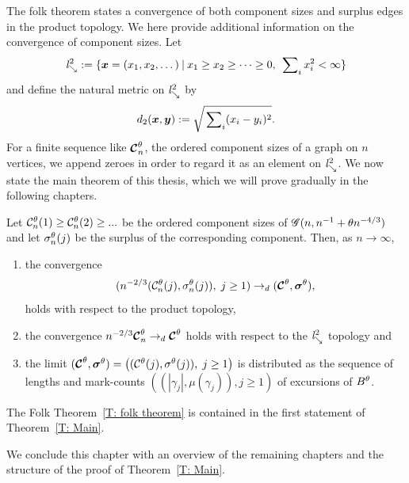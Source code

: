 The folk theorem states a convergence of both component sizes and surplus edges in the product topology.
We here provide additional information on the convergence of component sizes.
Let
\begin{equation} \label{D: ld}
	\mathit{l}^2_{\searrow} := \{ \boldsymbol{x} = (x_1, x_2, \dots) \: | \: x_1 \geq x_2 \geq \dots \geq 0, \; \sideset{}{_i}\sum x^2_i < \infty \}
\end{equation}
and define the natural metric on $\mathit{l}^2_{\searrow}$ by
\begin{equation}
	d_2(\boldsymbol{x},\boldsymbol{y}) := \sqrt{\sideset{}{_i}\sum (x_i - y_i)^2}.
\end{equation}
For a finite sequence like $\boldsymbol{\mathcal{C}}^{\theta}_n$, the ordered component sizes of a graph on $n$ vertices, we append zeroes in order to regard it as an element on $\mathit{l}^2_{\searrow}$.
We now state the main theorem of this thesis, which we will prove gradually in the following chapters.

\begin{theorem} \label{T: Main}
	Let $\mathcal{C}^{\theta}_n(1) \geq \mathcal{C}^{\theta}_n(2) \geq ... $ be the ordered component sizes of $\mathscr{G}(n, n^{-1} + \theta n^{-4/3})$
	and let $\mathcal{\sigma}^{\theta}_n(j)$ be the surplus of the corresponding component.
	Then, as $n \rightarrow \infty$,
	\begin{enumerate}
		\item the convergence
		\begin{equation}
		( n^{-2 / 3} ( \mathcal{C}^{\theta}_n(j), \mathcal{\sigma}^{\theta}_n(j) ), \; j \geq 1 ) 
		\rightarrow_d
		( \boldsymbol{\mathcal{C}}^{\theta}, \boldsymbol{\mathcal{\sigma}}^{\theta} ),
		\end{equation}
		holds with respect to the product topology,
		
		\item the convergence $n^{-2 / 3} \boldsymbol{\mathcal{C}}^{\theta}_n \rightarrow_d \boldsymbol{\mathcal{C}}^{\theta}$
		holds with respect to the $\mathit{l}^2_{\searrow}$ topology and
		
		\item the limit
		$( \boldsymbol{\mathcal{C}}^{\theta}, \boldsymbol{\mathcal{\sigma}}^{\theta} ) = \left( ( \mathcal{C}^{\theta}(j), \mathcal{\sigma}^{\theta}(j) ), \; j \geq 1 \right)$
		is distributed as the sequence of lengths and mark-counts
		$ \left( (|\gamma_j|, \mu(\gamma_j)), j \geq 1  \right) $
		of excursions of $B^{\theta}$.
	\end{enumerate}
\end{theorem}
\begin{note}
	The Folk Theorem~\ref{T: folk theorem} is contained in the first statement of Theorem~\ref{T: Main}.
\end{note}


We conclude this chapter with an overview of the remaining chapters and the structure of the proof of Theorem~\ref{T: Main}.

